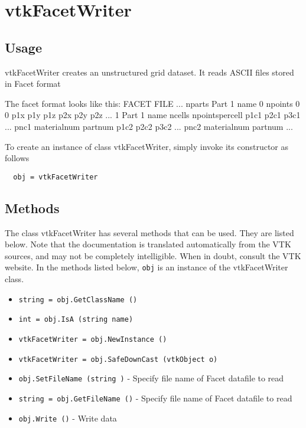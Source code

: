 \section{vtkFacetWriter}

\subsection{Usage}

 vtkFacetWriter creates an unstructured grid dataset. It reads ASCII files
 stored in Facet format

 The facet format looks like this:
 FACET FILE ...
 nparts
 Part 1 name
 0
 npoints 0 0
 p1x p1y p1z
 p2x p2y p2z
 ...
 1
 Part 1 name
 ncells npointspercell
 p1c1 p2c1 p3c1 ... pnc1 materialnum partnum
 p1c2 p2c2 p3c2 ... pnc2 materialnum partnum
 ...

To create an instance of class vtkFacetWriter, simply
invoke its constructor as follows
\begin{verbatim}
  obj = vtkFacetWriter
\end{verbatim}
\subsection{Methods}

The class vtkFacetWriter has several methods that can be used.
  They are listed below.
Note that the documentation is translated automatically from the VTK sources,
and may not be completely intelligible.  When in doubt, consult the VTK website.
In the methods listed below, \verb|obj| is an instance of the vtkFacetWriter class.
\begin{itemize}
\item  \verb|string = obj.GetClassName ()|

\item  \verb|int = obj.IsA (string name)|

\item  \verb|vtkFacetWriter = obj.NewInstance ()|

\item  \verb|vtkFacetWriter = obj.SafeDownCast (vtkObject o)|

\item  \verb|obj.SetFileName (string )| -  Specify file name of Facet datafile to read

\item  \verb|string = obj.GetFileName ()| -  Specify file name of Facet datafile to read

\item  \verb|obj.Write ()| -  Write data

\end{itemize}
